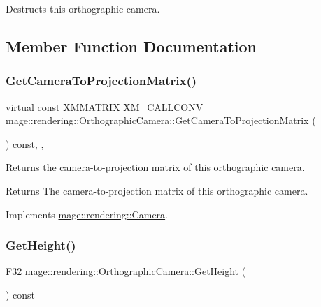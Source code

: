 Destructs this orthographic camera. 

\subsection{Member Function Documentation}
\hypertarget{classmage_1_1rendering_1_1_orthographic_camera_a45736d696df0a38c8f1342dca2cda0cd}{}\label{classmage_1_1rendering_1_1_orthographic_camera_a45736d696df0a38c8f1342dca2cda0cd} 
\subsubsection{\texorpdfstring{Get\+Camera\+To\+Projection\+Matrix()}{GetCameraToProjectionMatrix()}}
{\footnotesize\ttfamily virtual const X\+M\+M\+A\+T\+R\+IX X\+M\+\_\+\+C\+A\+L\+L\+C\+O\+NV mage\+::rendering\+::\+Orthographic\+Camera\+::\+Get\+Camera\+To\+Projection\+Matrix (\begin{DoxyParamCaption}{ }\end{DoxyParamCaption}) const\hspace{0.3cm}{\ttfamily [override]}, {\ttfamily [virtual]}, {\ttfamily [noexcept]}}

Returns the camera-\/to-\/projection matrix of this orthographic camera.

\begin{DoxyReturn}{Returns}
The camera-\/to-\/projection matrix of this orthographic camera. 
\end{DoxyReturn}


Implements \hyperlink{classmage_1_1rendering_1_1_camera_a08481175c3718a24333b22176e240d44}{mage\+::rendering\+::\+Camera}.

\hypertarget{classmage_1_1rendering_1_1_orthographic_camera_a28f5a12f9c137fd2c76a17fd5f5565c1}{}\label{classmage_1_1rendering_1_1_orthographic_camera_a28f5a12f9c137fd2c76a17fd5f5565c1} 
\subsubsection{\texorpdfstring{Get\+Height()}{GetHeight()}}
{\footnotesize\ttfamily \hyperlink{namespacemage_aa97e833b45f06d60a0a9c4fc22ae02c0}{F32} mage\+::rendering\+::\+Orthographic\+Camera\+::\+Get\+Height (\begin{DoxyParamCaption}{ }\end{DoxyParamCaption}) const\hspace{0.3cm}{\ttfamily [noexcept]}}

